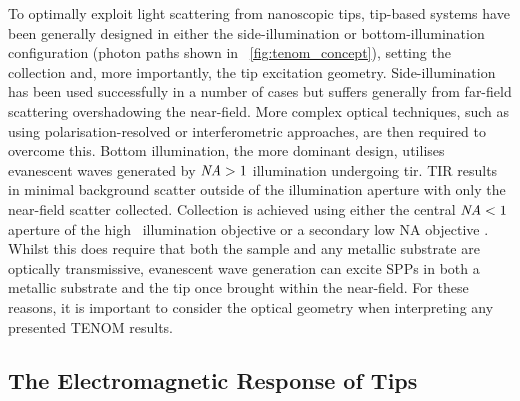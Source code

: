 \documentclass{article}
\begin{document}
To optimally exploit light scattering from nanoscopic tips, tip-based systems have been generally designed in either the side-illumination or bottom-illumination configuration (photon paths shown in \figurename~\ref{fig:tenom_concept}), setting the collection and, more importantly, the tip excitation geometry. Side-illumination has been used successfully in a number of cases \cite{mehtani2006, steidtner2007, zhang2013, wickramasinghe2014} but suffers generally from far-field scattering overshadowing the near-field. More complex optical techniques, such as using polarisation-resolved or interferometric approaches, are then required to overcome this. %
Bottom illumination, the more dominant design, utilises evanescent waves generated by $\mathit{NA}>1$ illumination undergoing \gls{tir}. TIR results in minimal background scatter outside of the illumination aperture with only the near-field scatter collected. Collection is achieved using either the central $\mathit{NA}<1$ aperture of the high \NA\ illumination objective \cite{hayazawa2001, yeo2006, yeo2007, zhang2013experimental, mino2014, kumar2014} or a secondary low NA objective \cite{hayazawa2007, taguchi2009, uetsuki2012}. Whilst this does require that both the sample and any metallic substrate are optically transmissive, evanescent wave generation can excite SPPs in both a metallic substrate and the tip once brought within the near-field. For these reasons, it is important to consider the optical geometry when interpreting any presented TENOM results.

\subsection{The Electromagnetic Response of Tips}
\end{document}
